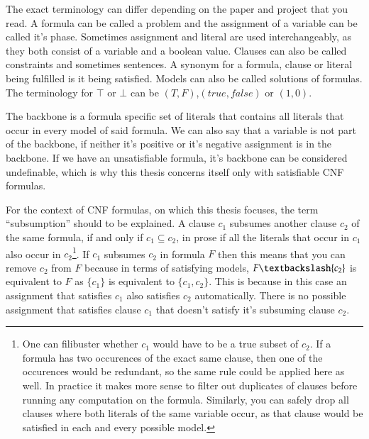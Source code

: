 

The exact terminology can differ depending on the paper and project that you read. A formula can be called a problem and the assignment of a variable can be called it's phase. Sometimes assignment and literal are used interchangeably, as they both consist of a variable and a boolean value. Clauses can also be called constraints and sometimes sentences. A synonym for a formula, clause or literal being fulfilled is it being satisfied. Models can also be called solutions of formulas. The terminology for $\top$ or $\bot$ can be $(T,F)$,$(true,false)$ or $(1,0)$.



The backbone is a formula specific set of literals that contains all literals that occur in every model of said formula. We can also say that a variable is not part of the backbone, if neither it's positive or it's negative assignment is in the backbone. If we have an unsatisfiable formula, it's backbone can be considered undefinable, which is why this thesis concerns itself only with satisfiable CNF formulas.

For the context of CNF formulas, on which this thesis focuses, the term ``subsumption'' should to be explained. A clause $c_1$ subsumes another clause $c_2$ of the same formula, if and only if $c_1 \subseteq c_2$, in prose if all the literals that occur in $c_1$ also occur in $c_2$\footnote{
	One can filibuster whether $c_1$ would have to be a true subset of $c_2$. If a formula has two occurences of the exact same clause, then one of the occurences would be redundant, so the same rule could be applied here as well. In practice it makes more sense to filter out duplicates of clauses before running any computation on the formula. Similarly, you can safely drop all clauses where both literals of the same variable occur, as that clause would be satisfied in each and every possible model.}.
If $c_1$ subsumes $c_2$ in formula $F$ then this means that you can remove $c_2$ from $F$ because in terms of satisfying models, $F\textbackslash \{c_2\}$ is equivalent to $F$ as $\{c_1\}$ is equivalent to $\{c_1,c_2\}$. This is because in this case an assignment that satisfies $c_1$ also satisfies $c_2$ automatically. There is no possible assignment that satisfies clause $c_1$ that doesn't satisfy it's subsuming clause $c_2$.
